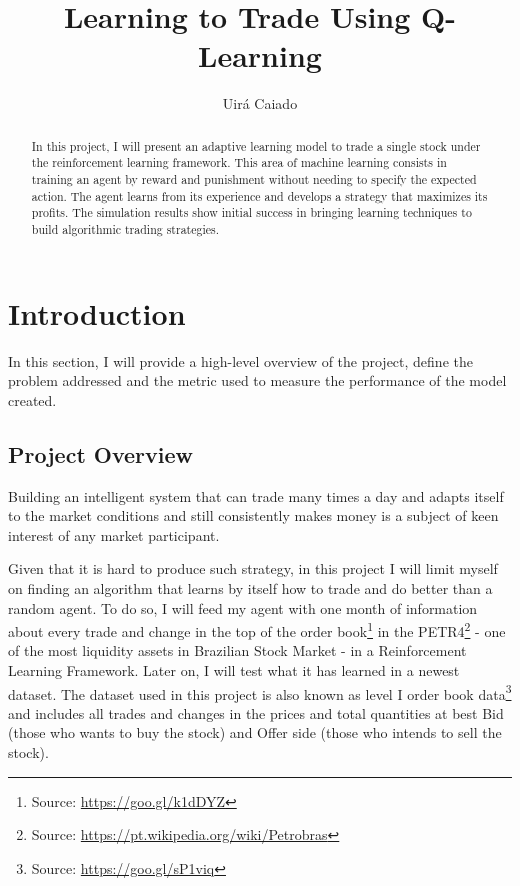 \documentclass[a4paper]{article}
\title{Learning to Trade Using Q-Learning}
\author{Uirá Caiado}
\begin{document}
\maketitle

\begin{abstract}
In this project, I will present an adaptive learning model to trade a single stock under the reinforcement learning framework. This area of machine learning consists in training an agent by reward and punishment without needing to specify the expected action. The agent learns from its experience and develops a strategy that maximizes its profits. The simulation results show initial success in bringing learning techniques to build algorithmic trading strategies.
\end{abstract}


\section{Introduction}
\label{sec:introduction}

In this section, I will provide a high-level overview of the project, define the problem addressed and the metric used to measure the performance of the model created.

\subsection{Project Overview}
Building an intelligent system that can trade many times a day and adapts itself to the market conditions and still consistently makes money is a subject of keen interest of any market participant.

Given that it is hard to produce such strategy, in this project I will limit myself on finding an algorithm that learns by itself how to trade and do better than a random agent. To do so, I will feed my agent with one month of information about every trade and change in the top of the order book\footnote{Source: \url{https://goo.gl/k1dDYZ}} in the PETR4\footnote{Source: \url{https://pt.wikipedia.org/wiki/Petrobras}} - one of the most liquidity assets in Brazilian Stock Market - in a Reinforcement Learning Framework. Later on, I will test what it has learned in a newest dataset. The dataset used in this project is also known as level I order book data\footnote{Source: \url{https://goo.gl/sP1viq}} and includes all trades and changes in the prices and total quantities at best Bid (those who wants to buy the stock) and Offer side (those who intends to sell the stock).
\end{document}
